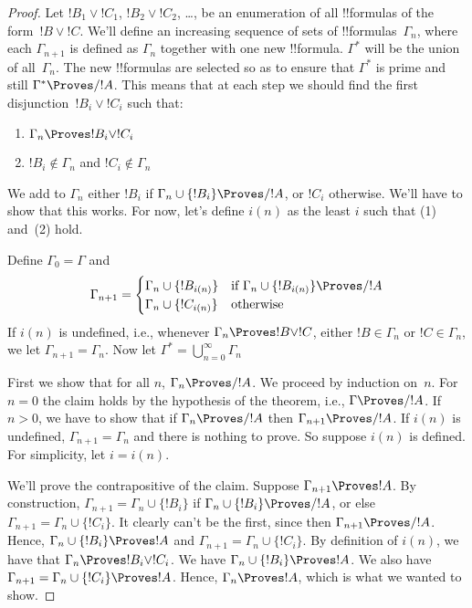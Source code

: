 \documentclass[../../../include/open-logic-section]{subfiles}
\begin{document}
\begin{proof}
  Let $!B_1 \lor !C_1$, $!B_2 \lor !C_2$, \dots, be an enumeration of
  all !!{formula}s of the form~$!B \lor !C$.  We'll define an
  increasing sequence of sets of !!{formula}s~$\Gamma_n$, where each
  $\Gamma_{n+1}$ is defined as $\Gamma_n$ together with one new
  !!{formula}. $\Gamma^*$ will be the union of all~$\Gamma_n$. The new
  !!{formula}s are selected so as to ensure that $\Gamma^*$ is prime
  and still $\Gamma^* \Proves/ !A$. This means that at each step we
  should find the first disjunction~$!B_i \lor !C_i$ such that:
  \begin{enumerate}
  \item $\Gamma_n \Proves !B_i \lor !C_i$
  \item $!B_i \notin \Gamma_n$ and $!C_i \notin \Gamma_n$
  \end{enumerate}
  We add to $\Gamma_n$ either $!B_i$ if $\Gamma_n \cup \{!B_i\}
  \Proves/ !A$, or $!C_i$ otherwise. We'll have to show that this
  works. For now, let's define $i(n)$ as the least $i$ such
  that (1) and~(2) hold.
  
  Define $\Gamma_0 = \Gamma$ and
  \[
  \Gamma_{n+1} = \begin{cases}
    \Gamma_n \cup \{!B_{i(n)}\} &
    \text{if $\Gamma_n \cup \{!B_{i(n)}\} \Proves/ !A$} \\
    \Gamma_n \cup \{!C_{i(n)}\} & \text{otherwise}
    \end{cases}
  \]
  If $i(n)$ is undefined, i.e., whenever $\Gamma_n \Proves !B \lor !C$,
  either $!B \in \Gamma_n$ or $!C \in \Gamma_n$, we let $\Gamma_{n+1}
  = \Gamma_n$.  Now let $\Gamma^* = \bigcup_{n=0}^\infty \Gamma_n$

  First we show that for all $n$, $\Gamma_n \Proves/ !A$. We proceed
  by induction on~$n$. For $n = 0$ the claim holds by the hypothesis
  of the theorem, i.e., $\Gamma \Proves/ !A$. If $n>0$, we have to
  show that if $\Gamma_n \Proves/ !A$ then $\Gamma_{n+1} \Proves/ !A$. If
  $i(n)$ is undefined, $\Gamma_{n+1} = \Gamma_n$ and there is nothing
  to prove. So suppose $i(n)$ is defined. For simplicity, let $i =
  i(n)$.
  
  We'll prove the contrapositive of the claim. Suppose $\Gamma_{n+1}
  \Proves !A$. By construction, $\Gamma_{n+1} = \Gamma_n \cup
  \{!B_i\}$ if $\Gamma_n \cup \{!B_i\} \Proves/ !A$, or else
  $\Gamma_{n+1} = \Gamma_n \cup \{!C_i\}$. It clearly can't be the
  first, since then $\Gamma_{n+1} \Proves/ !A$.  Hence, $\Gamma_n \cup
  \{!B_i\} \Proves !A$ and $\Gamma_{n+1} = \Gamma_n \cup \{!C_i\}$.
  By definition of $i(n)$, we have that $\Gamma _n \Proves !B_i \lor
  !C_i$. We have $\Gamma_n \cup \{!B_i\} \Proves !A$. We also have
  $\Gamma_{n+1} = \Gamma_n \cup \{!C_i\} \Proves !A$. Hence, $\Gamma_n
  \Proves !A$, which is what we wanted to show.


\end{proof}
\end{document}
